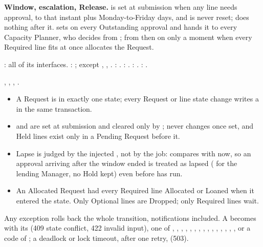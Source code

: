\textbf{Window, escalation, Release.}  is set at submission when any line needs approval, to that instant plus  Monday-to-Friday days, and is never reset;  does nothing after it.  sets  on every Outstanding approval and hands it to every Capacity Planner, who decides from ; from then on only a moment when every Required line fits at once allocates the Request.

: all of its interfaces. : ;  except , , . : . : . : . : .

, , , .

\begin{itemize}
\item A Request is in exactly one state; every Request or line state change writes a  in the same transaction.
\item {} and  are set at submission and cleared only by ;  never changes once set, and Held lines exist only in a Pending Request before it.
\item Lapse is judged by the injected , not by the job:  compares  with now, so an approval arriving after the window ended is treated as lapsed ( for the lending Manager, no Hold kept) even before  has run.
\item An Allocated Request had every Required line Allocated or Loaned when it entered the state. Only Optional lines are Dropped; only Required lines wait.
\end{itemize}

{\sloppy Any exception rolls back the whole transition, notifications included. A  becomes  with its  (409 state conflict, 422 invalid input), one of , , , , , , , , , , , , , , , or a code of ; a deadlock or lock timeout, after one retry,  (503).\par}

